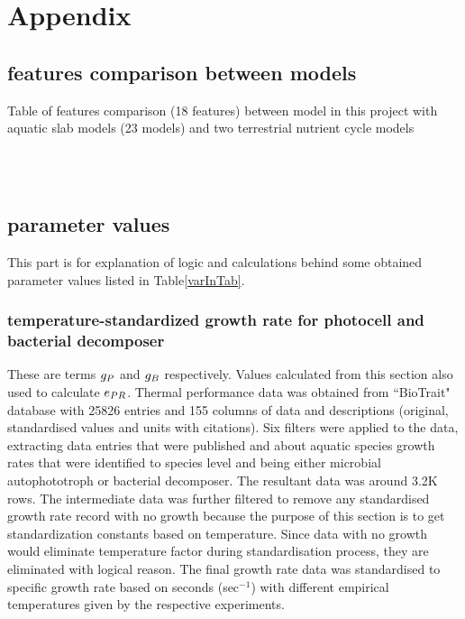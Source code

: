 \documentclass[../thesis.tex]{subfiles} %
\begin{document}
\section{Appendix}
\beginSupp

\subsection{features comparison between models}
\begin{table}[H]
\begin{tiny}
    \centering
    \caption[Model features comparison]{Table of features comparison (18 features) between model in this project with aquatic slab models (23 models) and two terrestrial nutrient cycle models}
    \\
    \vspace{.5cm}
    \\
    \vspace{.5cm}
    \label{modComp}
\end{tiny}
\end{table}

\subsection{parameter values}
This part is for explanation of logic and calculations behind some obtained parameter values listed in Table\ref{varInTab}.

\subsubsection{temperature-standardized growth rate for photocell and bacterial decomposer}
These are terms $g_P$ and $g_B$ respectively.  Values calculated from this section also used to calculate $e_{PR}$.  Thermal performance data was obtained from ``BioTrait" database\autocite{della2013thermal} with 25826 entries and 155 columns of data and descriptions (original, standardised values and units with citations).  Six filters were applied to the data, extracting data entries that were published and about aquatic species growth rates that were identified to species level and being either microbial autophototroph or bacterial decomposer.  The resultant data was around 3.2K rows.  The intermediate data was further filtered to remove any standardised growth rate record with no growth because the purpose of this section is to get standardization constants based on temperature.  Since data with no growth would eliminate temperature factor during standardisation process, they are eliminated with logical reason.  The final growth rate data was standardised to specific growth rate based on seconds (sec$^{-1}$) with different empirical temperatures given by the respective experiments.
\end{document}
